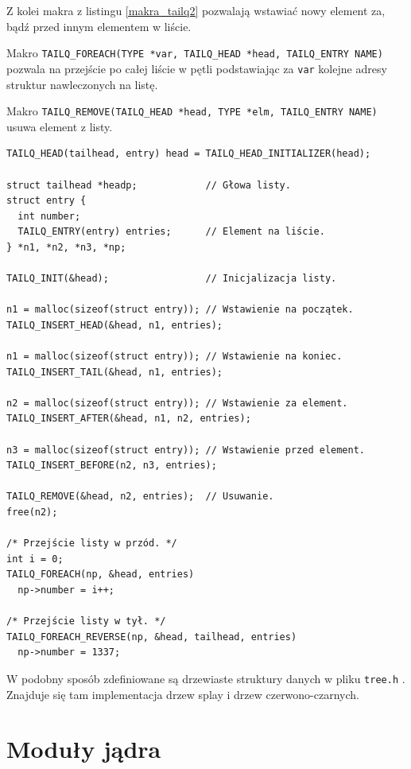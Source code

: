 \documentclass[shortabstract,inz]{iithesis}
\begin{document}
Z kolei makra z listingu \ref{makra_tailq2} pozwalają wstawiać nowy element za, bądź przed innym elementem w liście.

Makro \texttt{TAILQ\_FOREACH(TYPE	*var, TAILQ\_HEAD *head,	TAILQ\_ENTRY NAME)} \\
pozwala na przejście po całej liście w pętli podstawiając za \texttt{var} kolejne 
adresy struktur nawleczonych na listę.

Makro \texttt{TAILQ\_REMOVE(TAILQ\_HEAD *head, TYPE *elm, TAILQ\_ENTRY NAME)} \\
usuwa element z listy.

\begin{lstlisting}[caption=Przykład użycia TAILQ \cite{man:queue_3}]
TAILQ_HEAD(tailhead, entry) head = TAILQ_HEAD_INITIALIZER(head);

struct tailhead *headp;            // Głowa listy.
struct entry {
  int number;
  TAILQ_ENTRY(entry) entries;      // Element na liście.
} *n1, *n2, *n3, *np;

TAILQ_INIT(&head);                 // Inicjalizacja listy.

n1 = malloc(sizeof(struct entry)); // Wstawienie na początek.
TAILQ_INSERT_HEAD(&head, n1, entries);

n1 = malloc(sizeof(struct entry)); // Wstawienie na koniec.
TAILQ_INSERT_TAIL(&head, n1, entries);

n2 = malloc(sizeof(struct entry)); // Wstawienie za element.
TAILQ_INSERT_AFTER(&head, n1, n2, entries);

n3 = malloc(sizeof(struct entry)); // Wstawienie przed element.
TAILQ_INSERT_BEFORE(n2, n3, entries);

TAILQ_REMOVE(&head, n2, entries);  // Usuwanie.
free(n2);

/* Przejście listy w przód. */
int i = 0;
TAILQ_FOREACH(np, &head, entries)
  np->number = i++;

/* Przejście listy w tył. */
TAILQ_FOREACH_REVERSE(np, &head, tailhead, entries)
  np->number = 1337;
\end{lstlisting}


W podobny sposób zdefiniowane są drzewiaste struktury danych w pliku \texttt{tree.h} \cite{tree_h}.
Znajduje się tam implementacja drzew splay i drzew czerwono-czarnych.




\section{Moduły jądra} %
\end{document}
